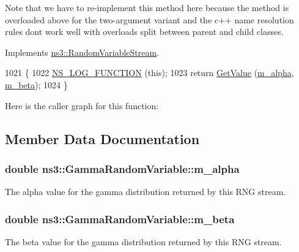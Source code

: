 Note that we have to re-\/implement this method here because the method is overloaded above for the two-\/argument variant and the c++ name resolution rules don\textquotesingle{}t work well with overloads split between parent and child classes. 

Implements \hyperlink{classns3_1_1RandomVariableStream_a4fa5944dc4cb11544e661ed23072b36c}{ns3\+::\+Random\+Variable\+Stream}.


\begin{DoxyCode}
1021 \{
1022   \hyperlink{log-macros-disabled_8h_a90b90d5bad1f39cb1b64923ea94c0761}{NS\_LOG\_FUNCTION} (\textcolor{keyword}{this});
1023   \textcolor{keywordflow}{return} \hyperlink{classns3_1_1GammaRandomVariable_a65261ad340fa57dbaa5802a7bea354db}{GetValue} (\hyperlink{classns3_1_1GammaRandomVariable_a4f69114edfb9930edc95e368f9d37128}{m\_alpha}, \hyperlink{classns3_1_1GammaRandomVariable_af9e209b6f30711920d0cb502e382e85a}{m\_beta});
1024 \}
\end{DoxyCode}


Here is the caller graph for this function\+:




\subsection{Member Data Documentation}
\subsubsection[{\texorpdfstring{m\+\_\+alpha}{m_alpha}}]{\setlength{\rightskip}{0pt plus 5cm}double ns3\+::\+Gamma\+Random\+Variable\+::m\+\_\+alpha\hspace{0.3cm}{\ttfamily [private]}}\hypertarget{classns3_1_1GammaRandomVariable_a4f69114edfb9930edc95e368f9d37128}{}\label{classns3_1_1GammaRandomVariable_a4f69114edfb9930edc95e368f9d37128}
The alpha value for the gamma distribution returned by this R\+NG stream. 
\subsubsection[{\texorpdfstring{m\+\_\+beta}{m_beta}}]{\setlength{\rightskip}{0pt plus 5cm}double ns3\+::\+Gamma\+Random\+Variable\+::m\+\_\+beta\hspace{0.3cm}{\ttfamily [private]}}\hypertarget{classns3_1_1GammaRandomVariable_af9e209b6f30711920d0cb502e382e85a}{}\label{classns3_1_1GammaRandomVariable_af9e209b6f30711920d0cb502e382e85a}
The beta value for the gamma distribution returned by this R\+NG stream. 
